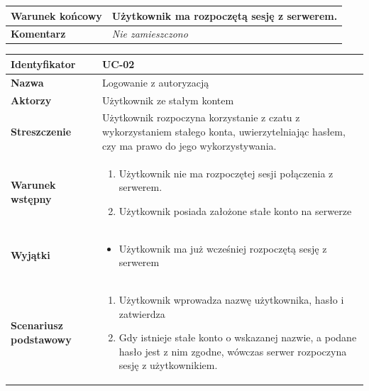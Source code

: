 {\begin{tabular}{ | l | l | }
	\hline
		\parbox[t]{4cm}{\textbf{Warunek końcowy}} & \parbox[t]{11cm}{
			Użytkownik ma rozpoczętą sesję z serwerem.
		}
		\\
		
	\hline
		\parbox[t]{4cm}{\textbf{Komentarz}} & \parbox[t]{11cm}{
			\textit{Nie zamieszczono}
		}
		\\

	\hline
\end{tabular}

\vspace{2em}

\begin{tabular}{ | l | l | }
	\hline
		\textbf{Identyfikator} & 
		UC-02
		\\
		
	\hline
		\textbf{Nazwa} & 
		Logowanie z autoryzacją
		\\
		
	\hline
		\textbf{Aktorzy} & \parbox[t]{11cm}{
			Użytkownik ze stałym kontem
		}\\
		 
	\hline
		\parbox[t]{4cm}{\textbf{Streszczenie}} & \parbox[t]{11cm}{
			Użytkownik rozpoczyna korzystanie z czatu z wykorzystaniem
			stałego konta, uwierzytelniając hasłem, czy ma prawo do
			jego wykorzystywania.
			
		}\\
		
	\hline
		\parbox[t]{4cm}{\textbf{Warunek wstępny}} & \parbox[t]{11cm}{
			\begin{enumerate}
				\item Użytkownik nie ma rozpoczętej sesji połączenia 
				z serwerem.
				\item Użytkownik posiada założone stałe konto na serwerze
			\end{enumerate}
			
		}
		\\
		
	\hline
		\parbox[t]{4cm}{\textbf{Wyjątki}} & \parbox[t]{11cm}{
			\begin{itemize}
				\item Użytkownik ma już wcześniej rozpoczętą
				 sesję z serwerem
			\end{itemize}
			
		}
		\\

	\hline
		\parbox[t]{4cm}{\textbf{Scenariusz podstawowy}} & \parbox[t]{11cm}{
			\begin{enumerate}
				\item Użytkownik wprowadza nazwę użytkownika, hasło 
				i zatwierdza
				\item Gdy istnieje stałe konto o wskazanej nazwie, a
				podane hasło jest z nim zgodne, wówczas serwer rozpoczyna
				sesję z użytkownikiem.
			\end{enumerate}
		}
		\\
		

\end{tabular}}
